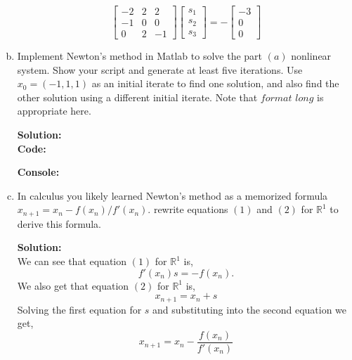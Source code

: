 \documentclass[12pt]{article}
\makeatletter
\theoremstyle{homework}
\newenvironment{exercise}[1]
{\def\@currentlabel{#1}\exercisecore}
{\endexercisecore}
\newcommand{\localhead}[1]{\par\smallskip\noindent\textbf{#1}\nobreak\\}%
\newcommand\solution{\localhead{Solution:}}
\newcommand{\Reals}{\ensuremath{\mathbb R}}
\let\RR\Reals
\makeatother
\begin{document}
\begin{exercise}{P5}
\begin{enumerate}[a.]
\begin{equation*}
\begin{bmatrix}
              -2 & 2 & 2  \\
              -1 & 0 & 0  \\
              0  & 2 & -1
            \end{bmatrix}
            \begin{bmatrix}
              s_1 \\
              s_2 \\
              s_3
            \end{bmatrix}
            = -
            \begin{bmatrix}
              -3 \\
              0  \\
              0
            \end{bmatrix}
          \end{equation*}
          \vspace{.15in}

    \item Implement Newton's method in Matlab to solve the part $(a)$ nonlinear system. Show your script and
          generate at least five iterations. Use $x_0 = (-1,1,1)$ as an initial iterate to find one solution, and
          also find the other solution using a different initial iterate. Note that $format$ $long$ is appropriate here.\\
          \solution
          \textbf{Code:}
          \begin{center}
            
          \end{center}

          \textbf{Console:}
          \begin{center}
            
          \end{center}
          \vspace{.15in}

    \item In calculus you likely learned Newton's method as a memorized formula $x_{n+1} =x_n - f(x_n)/f'(x_n)$.
          rewrite equations $(1)$ and $(2)$ for $\RR^1$ to derive this formula.
          \solution  We can see that equation $(1)$ for $\RR^1$ is,
          \begin{equation*}
            f'(x_n)s =-f(x_n).
          \end{equation*}
          We also get that equation $(2)$ for $\RR^1$ is,
          \begin{equation*}
            x_{n+1} = x_n + s
          \end{equation*}
          Solving the first equation for $s$ and substituting into the second equation we get,
          \begin{equation*}
            x_{n+1} = x_n - \dfrac{f(x_n)}{f'(x_n)}
          \end{equation*}
  \end{enumerate}
\end{exercise}
\vspace{.25in}
\end{document}
